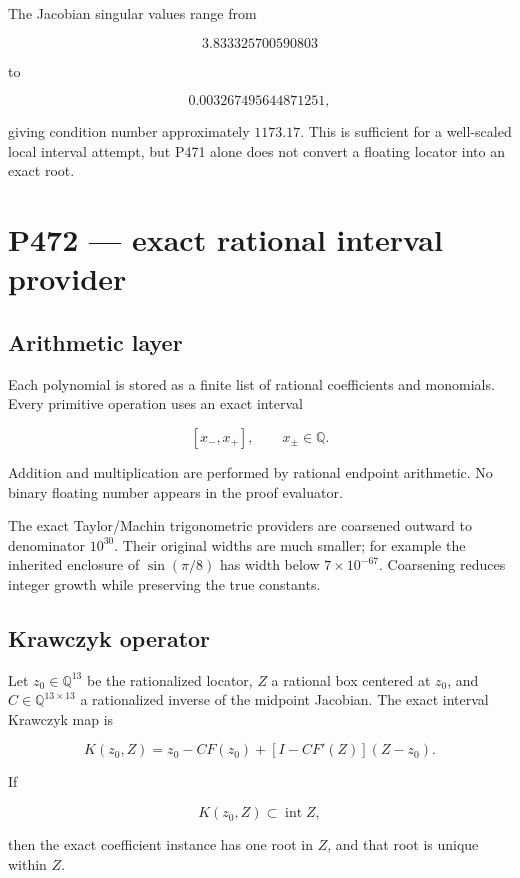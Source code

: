 \documentclass[11pt,a4paper,openany]{report}
\begin{document}
The Jacobian singular values range from

\[
3.833325700590803
\]

to

\[
0.003267495644871251,
\]

giving condition number approximately \(1173.17\). This is sufficient for a well-scaled local interval attempt, but P471 alone does not convert a floating locator into an exact root.

\chapter{P472 --- exact rational interval provider}

\section{Arithmetic layer}

Each polynomial is stored as a finite list of rational coefficients and monomials. Every primitive operation uses an exact interval

\[
[x_-,x_+],\qquad x_\pm\in\mathbb Q.
\]

Addition and multiplication are performed by rational endpoint arithmetic. No binary floating number appears in the proof evaluator.

The exact Taylor/\allowbreak{}Machin trigonometric providers are coarsened outward to denominator \(10^{30}\). Their original widths are much smaller; for example the inherited enclosure of \(\sin(\pi/8)\) has width below \(7\times10^{-67}\). Coarsening reduces integer growth while preserving the true constants.

\section{Krawczyk operator}

Let \(z_0\in\mathbb Q^{13}\) be the rationalized locator, \(Z\) a rational box centered at \(z_0\), and \(C\in\mathbb Q^{13\times13}\) a rationalized inverse of the midpoint Jacobian. The exact interval Krawczyk map is

\[
K(z_0,Z)=
z_0-CF(z_0)+
\left[I-CF'(Z)\right](Z-z_0).
\]

If

\[
K(z_0,Z)\subset\operatorname{int}Z,
\]

then the exact coefficient instance has one root in \(Z\), and that root is unique within \(Z\).
\end{document}
